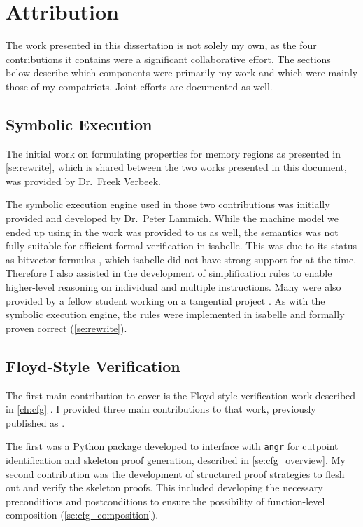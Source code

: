 \chapter{Attribution}\label{attribution}
The work presented in this dissertation is not solely my own,
as the four contributions it contains were a significant collaborative effort.
The sections below describe which components were primarily my work
and which were mainly those of my compatriots.
Joint efforts are documented as well.

\section*{Symbolic Execution}
The initial work on formulating properties for memory regions
as presented in \cref{se:rewrite},
which is shared between the two works presented in this document,
was provided by Dr.~Freek Verbeek.

The symbolic execution engine used in those two contributions was initially provided and developed by Dr.~Peter Lammich.
While the machine model we ended up using in the work was provided to us as well,
the semantics was not fully suitable for efficient formal verification in \gls{isabelle}.
This was due to its status as bitvector formulas \autocite{roessle2019verified}, which \gls{isabelle} did not have strong support for at the time.
Therefore I also assisted in the development of simplification rules
to enable higher-level reasoning on individual and multiple instructions.
Many were also provided by a fellow student working on a tangential project \autocite{verbeek2019refinement}.
As with the symbolic execution engine, the rules were implemented in \gls{isabelle} and formally proven correct (\cref{se:rewrite}).

\section*{Floyd-Style Verification}\label{attribute1}
The first main contribution to cover is the Floyd-style verification work described in \cref{ch:cfg} \autocite{bockenek2019preservation}.
I provided three main contributions to that work, previously published as .

The first was a Python package developed to interface with \texttt{angr}
\autocite{shoshitaishvili2016state}
for cutpoint identification and skeleton proof generation,
described in \cref{se:cfg_overview}.
My second contribution was the development of structured proof strategies to flesh out and verify the skeleton proofs.
This included developing the necessary preconditions and postconditions to ensure the possibility of function-level composition (\cref{se:cfg_composition}).

